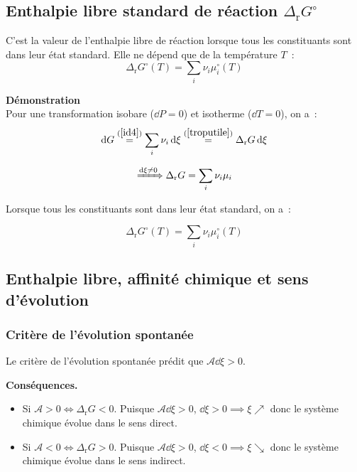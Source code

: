 \documentclass{article}
\let\oldref\ref
\renewcommand{\ref}[1]{(\oldref{#1})}
\newcommand{\Dr}{\Delta_{\mathrm{r}}}
\begin{document}
\subsection{Enthalpie libre standard de réaction $\Dr G^\circ$}
\begin{enonce}
    C’est la valeur de l’enthalpie libre de réaction lorsque tous les constituants sont dans leur état standard. Elle ne dépend que de la température $T$~:
    $$\Dr G^\circ(T) = \sum_i \nu_i\mu_i^\circ(T)$$
\end{enonce}
\begin{tableau}
    \textbf{Démonstration}\\
    Pour une transformation isobare ($\dd{P}= 0$) et isotherme ($\dd{T} =0$), on a~:
    $$\dd{G} \overset{\ref{id4}}{=} \sum_i\nu_i \dd{\xi} \overset{\ref{troputile}}{=} \Dr G\dd{\xi}$$
    \begin{important}
    \begin{equation}\label{drgiso}
        \xRightarrow[]{\dd{\xi}\neq 0} \Dr G = \sum_i \nu_i\mu_i
    \end{equation}
    \end{important}
    Lorsque tous les constituants sont dans leur état standard, on a~:
    \begin{important}
    \begin{equation*}
        \Dr G^\circ(T) = \sum_i \nu_i\mu_i^\circ(T)
    \end{equation*}
    \end{important}
\end{tableau}
\subsection{Enthalpie libre, affinité chimique et sens d’évolution}
\subsubsection{Critère de l’évolution spontanée}
\begin{tableau}
    \begin{enonce}[Rappel]
        Le critère de l'évolution spontanée prédit que $\mathscr{A}\dd{\xi} >0$.
    \end{enonce}
    \textbf{Conséquences.}
    \begin{itemize}
        \item Si $\mathscr{A}>0 \iff \Dr G<0$. Puisque $\mathscr{A}\dd{\xi} >0$, $\dd{\xi} >0 \implies \xi \nearrow$ donc le système chimique évolue dans le sens direct.
        \item Si $\mathscr{A}<0 \iff \Dr G>0$. Puisque $\mathscr{A}\dd{\xi} >0$, $\dd{\xi} <0 \implies \xi \searrow$ donc le système chimique évolue dans le sens indirect.
    \end{itemize}
\end{tableau}
\end{document}
